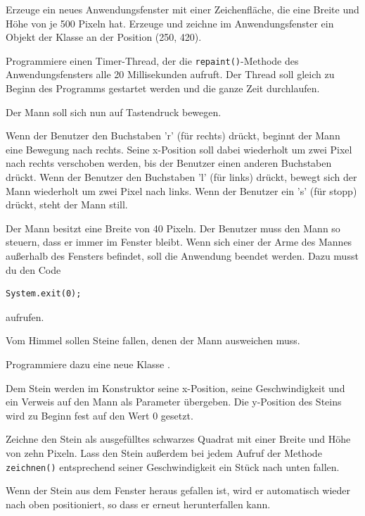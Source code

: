 \begin{compactenum}[a)]
\item Erzeuge ein neues Anwendungsfenster mit einer Zeichenfläche, die eine
Breite und Höhe von je 500 Pixeln hat. Erzeuge und zeichne im Anwendungsfenster
ein Objekt der Klasse  an der Position (250, 420).

\item Programmiere einen Timer-Thread, der die \lstinline|repaint()|-Methode des
Anwendungsfensters alle 20 Millisekunden aufruft. Der Thread soll gleich zu
Beginn des Programms gestartet werden und die ganze Zeit durchlaufen.

\item Der Mann soll sich nun auf Tastendruck bewegen.

Wenn der Benutzer den Buchstaben 'r' (für rechts) drückt, beginnt der Mann eine
Bewegung nach rechts. Seine x-Position soll dabei wiederholt um zwei Pixel nach
rechts verschoben werden, bis der Benutzer einen anderen Buchstaben drückt.
Wenn der Benutzer den Buchstaben 'l' (für links) drückt, bewegt sich der Mann
wiederholt um zwei Pixel nach links. Wenn der Benutzer ein 's' (für stopp)
drückt, steht der Mann still.

\item Der Mann besitzt eine Breite von 40 Pixeln. Der Benutzer muss den Mann so
steuern, dass er immer im Fenster bleibt. Wenn sich einer der Arme des Mannes
außerhalb des Fensters befindet, soll die Anwendung beendet werden. Dazu musst
du den Code

\begin{lstlisting}
System.exit(0);
\end{lstlisting}

aufrufen.

\item Vom Himmel sollen Steine fallen, denen der Mann ausweichen muss.

Programmiere dazu eine neue Klasse .

Dem Stein werden im Konstruktor seine x-Position, seine Geschwindigkeit und ein
Verweis auf den Mann als Parameter übergeben. Die y-Position des Steins wird zu
Beginn fest auf den Wert 0 gesetzt.

Zeichne den Stein als ausgefülltes schwarzes Quadrat mit einer Breite und Höhe
von zehn Pixeln. Lass den Stein außerdem bei jedem Aufruf der Methode
\lstinline|zeichnen()| entsprechend seiner Geschwindigkeit ein Stück nach unten
fallen.

Wenn der Stein aus dem Fenster heraus gefallen ist, wird er automatisch wieder
nach oben positioniert, so dass er erneut herunterfallen kann.


\end{compactenum}
